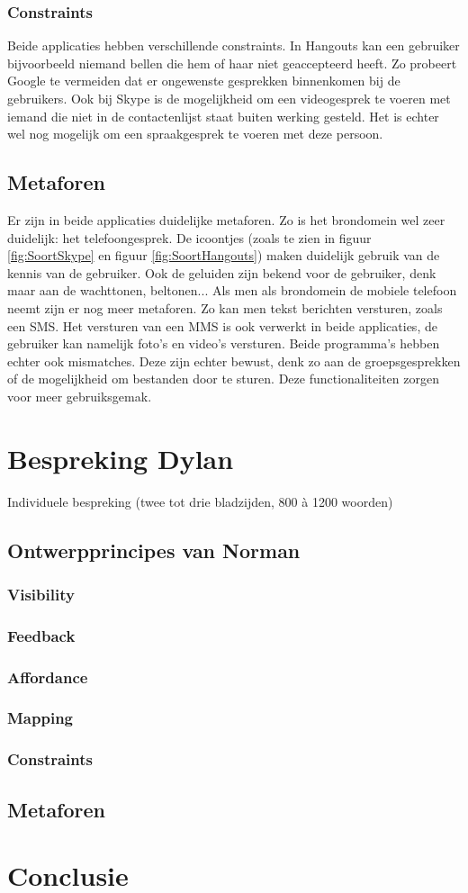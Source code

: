 \documentclass[11pt]{article}
\begin{document}
 \subsubsection{Constraints}
Beide applicaties hebben verschillende constraints. In Hangouts kan een gebruiker bijvoorbeeld niemand bellen die hem of haar niet geaccepteerd heeft. Zo probeert Google te vermeiden dat er ongewenste gesprekken binnenkomen bij de gebruikers. Ook bij Skype is de mogelijkheid om een videogesprek te voeren met iemand die niet in de contactenlijst staat buiten werking gesteld. Het is echter wel nog mogelijk om een spraakgesprek te voeren met deze persoon.
\subsection{Metaforen}
Er zijn in beide applicaties duidelijke metaforen. Zo is het brondomein wel zeer duidelijk: het telefoongesprek. De icoontjes (zoals te zien in figuur \ref{fig:SoortSkype} en figuur \ref{fig:SoortHangouts}) maken duidelijk gebruik van de kennis van de gebruiker. Ook de geluiden zijn bekend voor de gebruiker, denk maar aan de wachttonen, beltonen... 
\newline
Als men als brondomein de mobiele telefoon neemt zijn er nog meer metaforen. Zo kan men tekst berichten versturen, zoals een SMS. Het versturen van een MMS is ook verwerkt in beide applicaties, de gebruiker kan namelijk foto's en video's versturen. 
\newline
Beide programma's hebben echter ook mismatches. Deze zijn echter bewust, denk zo aan de groepsgesprekken of de mogelijkheid om bestanden door te sturen. Deze functionaliteiten zorgen voor meer gebruiksgemak. 
\newpage

\section{Bespreking Dylan}
Individuele bespreking (twee tot drie bladzijden, 800 à 1200 woorden)
\subsection{Ontwerpprincipes van Norman}
\subsubsection{Visibility}
\subsubsection{Feedback}
\subsubsection{Affordance}
\subsubsection{Mapping}
\subsubsection{Constraints}
\subsection{Metaforen}
\newpage


\section{Conclusie}

\newpage
\end{document}
